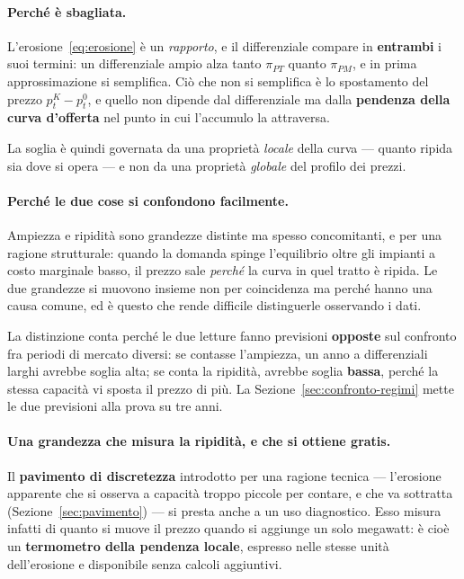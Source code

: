 \paragraph{Perch\'e \`e sbagliata.} L'erosione~\eqref{eq:erosione} \`e un \emph{rapporto}, e
il differenziale compare in \textbf{entrambi} i suoi termini: un differenziale ampio alza tanto
$\pi_{PT}$ quanto $\pi_{PM}$, e in prima approssimazione si semplifica. Ci\`o che non si
semplifica \`e lo spostamento del prezzo $p^{K}_t - p^{0}_t$, e quello non dipende dal
differenziale ma dalla \textbf{pendenza della curva d'offerta} nel punto in cui l'accumulo la
attraversa.

La soglia \`e quindi governata da una propriet\`a \emph{locale} della curva --- quanto ripida
sia dove si opera --- e non da una propriet\`a \emph{globale} del profilo dei prezzi.

\paragraph{Perch\'e le due cose si confondono facilmente.} Ampiezza e ripidit\`a sono grandezze
distinte ma spesso concomitanti, e per una ragione strutturale: quando la domanda spinge
l'equilibrio oltre gli impianti a costo marginale basso, il prezzo sale \emph{perch\'e} la
curva in quel tratto \`e ripida. Le due grandezze si muovono insieme non per coincidenza ma
perch\'e hanno una causa comune, ed \`e questo che rende difficile distinguerle osservando i
dati.

La distinzione conta perch\'e le due letture fanno previsioni \textbf{opposte} sul confronto
fra periodi di mercato diversi: se contasse l'ampiezza, un anno a differenziali larghi avrebbe
soglia alta; se conta la ripidit\`a, avrebbe soglia \textbf{bassa}, perch\'e la stessa
capacit\`a vi sposta il prezzo di pi\`u. La Sezione~\ref{sec:confronto-regimi} mette le due
previsioni alla prova su tre anni.

\paragraph{Una grandezza che misura la ripidit\`a, e che si ottiene gratis.} Il
\textbf{pavimento di discretezza} introdotto per una ragione tecnica --- l'erosione apparente
che si osserva a capacit\`a troppo piccole per contare, e che va sottratta
(Sezione~\ref{sec:pavimento}) --- si presta anche a un uso diagnostico. Esso misura infatti di
quanto si muove il prezzo quando si aggiunge un solo megawatt: \`e cio\`e un \textbf{termometro
della pendenza locale}, espresso nelle stesse unit\`a dell'erosione e disponibile senza calcoli
aggiuntivi.

